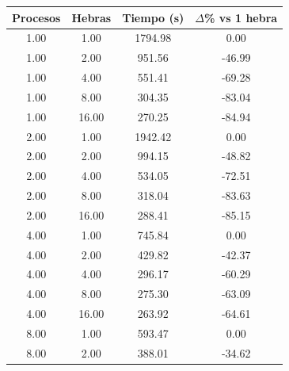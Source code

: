 \begin{table}[ht]
    \centering
    \begin{tabular}{|c|c|c|c|}
        \hline
        \textbf{Procesos} & \textbf{Hebras} & \textbf{Tiempo (s)} & \textbf{$\Delta$\% vs 1 hebra} \\
        \hline
        1.00              & 1.00            & 1794.98             & 0.00                           \\
        1.00              & 2.00            & 951.56              & -46.99                         \\
        1.00              & 4.00            & 551.41              & -69.28                         \\
        1.00              & 8.00            & 304.35              & -83.04                         \\
        1.00              & 16.00           & 270.25              & -84.94                         \\
        2.00              & 1.00            & 1942.42             & 0.00                           \\
        2.00              & 2.00            & 994.15              & -48.82                         \\
        2.00              & 4.00            & 534.05              & -72.51                         \\
        2.00              & 8.00            & 318.04              & -83.63                         \\
        2.00              & 16.00           & 288.41              & -85.15                         \\
        4.00              & 1.00            & 745.84              & 0.00                           \\
        4.00              & 2.00            & 429.82              & -42.37                         \\
        4.00              & 4.00            & 296.17              & -60.29                         \\
        4.00              & 8.00            & 275.30              & -63.09                         \\
        4.00              & 16.00           & 263.92              & -64.61                         \\
        8.00              & 1.00            & 593.47              & 0.00                           \\
        8.00              & 2.00            & 388.01              & -34.62                         \\

\end{tabular}
\end{table}

